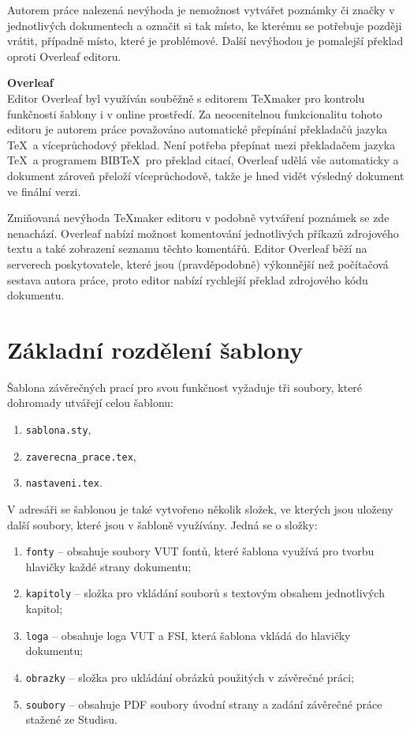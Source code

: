 Autorem práce nalezená nevýhoda je nemožnost vytvářet poznámky či značky v jednotlivých dokumentech a označit si tak místo, ke kterému se potřebuje později vrátit, případně místo, které je problémové. Další nevýhodou je pomalejší překlad oproti Overleaf editoru.

\vspace{8pt}
\textbf{Overleaf}\\
Editor Overleaf byl využíván souběžně s editorem \TeX maker pro kontrolu funkčnosti šablony i v online prostředí. Za neocenitelnou funkcionalitu tohoto editoru je autorem práce považováno automatické přepínání překladačů jazyka \TeX\ a víceprůchodový překlad. Není potřeba přepínat mezi překladačem jazyka \TeX\ a programem BIB\TeX\ pro překlad citací, Overleaf udělá vše automaticky a dokument zároveň přeloží víceprůchodově, takže je hned vidět výsledný dokument ve finální verzi.

Zmiňovaná nevýhoda \TeX maker editoru v podobně vytváření poznámek se zde nenachází. Overleaf nabízí možnost komentování jednotlivých příkazů zdrojového textu a také zobrazení seznamu těchto komentářů. Editor Overleaf běží na serverech poskytovatele, které jsou (pravděpodobně) výkonnější než počítačová sestava autora práce, proto editor nabízí rychlejší překlad zdrojového kódu dokumentu.



\section{Základní rozdělení šablony}
Šablona závěrečných prací pro svou funkčnost vyžaduje tři soubory, které dohromady utvářejí celou šablonu:

\begin{enumerate}
	\item \verb|sablona.sty|,
	\item \verb|zaverecna_prace.tex|,
	\item \verb|nastaveni.tex|.
\end{enumerate}

V adresáři se šablonou je také vytvořeno několik složek, ve kterých jsou uloženy další soubory, které jsou v šabloně využívány. Jedná se o složky:

\begin{enumerate}
	\item \verb|fonty| -- obsahuje soubory VUT fontů, které šablona využívá pro tvorbu hlavičky každé strany dokumentu;
	\item \verb|kapitoly| -- složka pro vkládání souborů s textovým obsahem jednotlivých kapitol;
	\item \verb|loga| -- obsahuje loga VUT a FSI, která šablona vkládá do hlavičky dokumentu;
	\item \verb|obrazky| -- složka pro ukládání obrázků použitých v závěrečné práci;
	\item \verb|soubory| -- obsahuje PDF soubory úvodní strany a zadání závěrečné práce stažené ze Studisu.
\end{enumerate}


